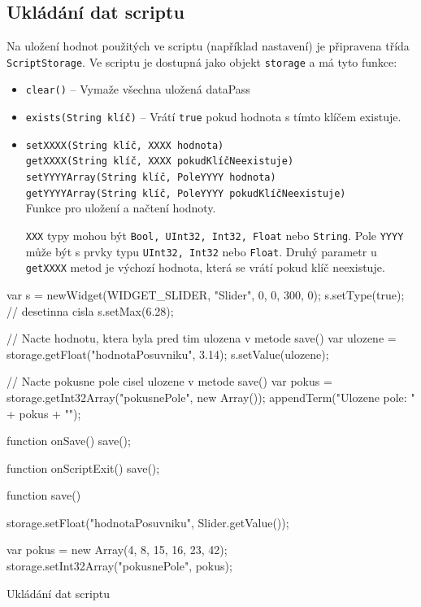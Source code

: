 \documentclass[12pt, a4paper, oneside]{article}
\begin{document}
\newpage
\subsection*{Ukládání dat scriptu}
Na uložení hodnot použitých ve scriptu (například nastavení) je připravena třída \verb|ScriptStorage|. Ve scriptu je dostupná jako objekt \verb|storage| a má tyto funkce:
\begin{itemize}
    \item {\color{blue}\verb/clear()/} -- Vymaže všechna uložená dataPass
    \item {\color{blue}\verb/exists(String klíč)/} -- Vrátí \verb|true| pokud hodnota s tímto klíčem existuje.
    \item {\color{blue}\verb/setXXXX(String klíč, XXXX hodnota)/} \\
        {\color{blue}\verb/getXXXX(String klíč, XXXX pokudKlíčNeexistuje)/} \\
        {\color{blue}\verb/setYYYYArray(String klíč, PoleYYYY hodnota)/} \\
        {\color{blue}\verb/getYYYYArray(String klíč, PoleYYYY pokudKlíčNeexistuje)/} \\
            Funkce pro uložení a načtení hodnoty.

        \verb|XXX| typy mohou být \verb|Bool, UInt32, Int32, Float| nebo \verb|String|. Pole \verb|YYYY| může být s prvky typu \verb|UInt32, Int32| nebo \verb|Float|. Druhý parametr u \verb|getXXXX| metod je výchozí hodnota, která se vrátí pokud klíč neexistuje.
\end{itemize}

\begin{listing}[H]
\begin{jscode}
var s = newWidget(WIDGET_SLIDER, "Slider", 0, 0, 300, 0);
s.setType(true); // desetinna cisla
s.setMax(6.28);

// Nacte hodnotu, ktera byla pred tim ulozena v metode save()
var ulozene = storage.getFloat("hodnotaPosuvniku", 3.14);
s.setValue(ulozene);

// Nacte pokusne pole cisel ulozene v metode save()
var pokus = storage.getInt32Array("pokusnePole", new Array());
appendTerm("Ulozene pole: " + pokus + "\n");

function onSave() {
    save();
}

function onScriptExit() {
    save();
}

function save() {
    storage.setFloat("hodnotaPosuvniku", Slider.getValue());

    var pokus = new Array(4, 8, 15, 16, 23, 42);
    storage.setInt32Array("pokusnePole", pokus);
}
\end{jscode}
\caption{Ukládání dat scriptu}
\end{listing}
\end{document}
